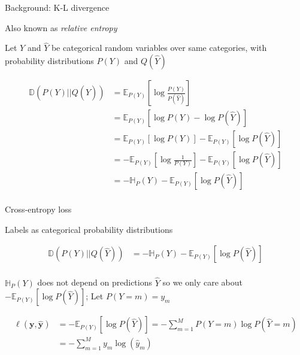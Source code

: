 \documentclass[12pt]{beamer}
\begin{document}
\begin{frame}{Background: K-L divergence}
	
Also known as \emph{relative entropy}

Let $Y$ and $\hat{Y}$ be categorical random variables over same categories, with probability distributions $P(Y)$ and $Q(\hat{Y})$
	
	\begin{align*}
	\mathbb{D}(P(Y) || Q(\hat{Y})) &= \mathbb{E}_{P(Y)} \left[ \log \frac{P(Y)}{P(\hat{Y})} \right] \\
	&= \mathbb{E}_{P(Y)} \left[ \log P(Y) - \log P(\hat{Y}) \right] \\
	&= \mathbb{E}_{P(Y)} \left[ \log P(Y)\right] - \mathbb{E}_{P(Y)} \left[ \log P(\hat{Y}) \right] \\
	&= - \mathbb{E}_{P(Y)} \left[ \log \frac{1}{P(Y)}\right] - \mathbb{E}_{P(Y)} \left[ \log P(\hat{Y}) \right] \\
	&= - \mathbb{H}_{P} (Y)  - \mathbb{E}_{P(Y)} \left[ \log P(\hat{Y}) \right] \\
	\end{align*}
	

	
\end{frame}


\begin{frame}{Cross-entropy loss}

Labels as categorical probability distributions

\begin{align*}
\mathbb{D}(P(Y) || Q(\hat{Y})) &= - \mathbb{H}_{P} (Y)  - \mathbb{E}_{P(Y)} \left[ \log P(\hat{Y}) \right] \\
\end{align*}

$\mathbb{H}_{P} (Y)$ does not depend on predictions $\hat{Y}$ so we only care about $- \mathbb{E}_{P(Y)} \left[ \log P(\hat{Y}) \right]$; Let $P(Y = m) = y_m$

\begin{align*}
\ell(\mathbf{y}, \hat{\mathbf{y}}) &= 
- \mathbb{E}_{P(Y)} \left[ \log P(\hat{Y}) \right]
= - \sum_{m = 1}^{M} P(Y = m) \log P(\hat{Y} = m)\\
&=-  \sum_{m = 1}^{M} y_m \log (\hat{y}_m) 
\end{align*}


\end{frame}
\end{document}
